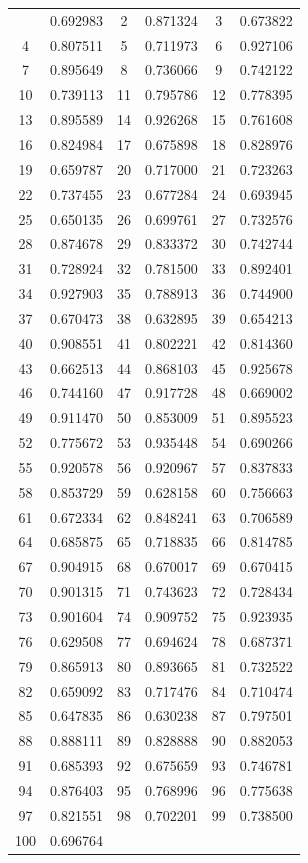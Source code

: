 \documentclass[12pt]{article}
\begin{document}
\begin{longtable}{@{}cc|cc|cc@{}}
\bottomrule
\endlastfoot
1 & 0.692983 & 2 & 0.871324 & 3 & 0.673822 \\
4 & 0.807511 & 5 & 0.711973 & 6 & 0.927106 \\
7 & 0.895649 & 8 & 0.736066 & 9 & 0.742122 \\
10 & 0.739113 & 11 & 0.795786 & 12 & 0.778395 \\
13 & 0.895589 & 14 & 0.926268 & 15 & 0.761608 \\
16 & 0.824984 & 17 & 0.675898 & 18 & 0.828976 \\
19 & 0.659787 & 20 & 0.717000 & 21 & 0.723263 \\
22 & 0.737455 & 23 & 0.677284 & 24 & 0.693945 \\
25 & 0.650135 & 26 & 0.699761 & 27 & 0.732576 \\
28 & 0.874678 & 29 & 0.833372 & 30 & 0.742744 \\
31 & 0.728924 & 32 & 0.781500 & 33 & 0.892401 \\
34 & 0.927903 & 35 & 0.788913 & 36 & 0.744900 \\
37 & 0.670473 & 38 & 0.632895 & 39 & 0.654213 \\
40 & 0.908551 & 41 & 0.802221 & 42 & 0.814360 \\
43 & 0.662513 & 44 & 0.868103 & 45 & 0.925678 \\
46 & 0.744160 & 47 & 0.917728 & 48 & 0.669002 \\
49 & 0.911470 & 50 & 0.853009 & 51 & 0.895523 \\
52 & 0.775672 & 53 & 0.935448 & 54 & 0.690266 \\
55 & 0.920578 & 56 & 0.920967 & 57 & 0.837833 \\
58 & 0.853729 & 59 & 0.628158 & 60 & 0.756663 \\
61 & 0.672334 & 62 & 0.848241 & 63 & 0.706589 \\
64 & 0.685875 & 65 & 0.718835 & 66 & 0.814785 \\
67 & 0.904915 & 68 & 0.670017 & 69 & 0.670415 \\
70 & 0.901315 & 71 & 0.743623 & 72 & 0.728434 \\
73 & 0.901604 & 74 & 0.909752 & 75 & 0.923935 \\
76 & 0.629508 & 77 & 0.694624 & 78 & 0.687371 \\
79 & 0.865913 & 80 & 0.893665 & 81 & 0.732522 \\
82 & 0.659092 & 83 & 0.717476 & 84 & 0.710474 \\
85 & 0.647835 & 86 & 0.630238 & 87 & 0.797501 \\
88 & 0.888111 & 89 & 0.828888 & 90 & 0.882053 \\
91 & 0.685393 & 92 & 0.675659 & 93 & 0.746781 \\
94 & 0.876403 & 95 & 0.768996 & 96 & 0.775638 \\
97 & 0.821551 & 98 & 0.702201 & 99 & 0.738500 \\
100 & 0.696764 &  &  &  &  \\

\end{longtable}
\end{document}
